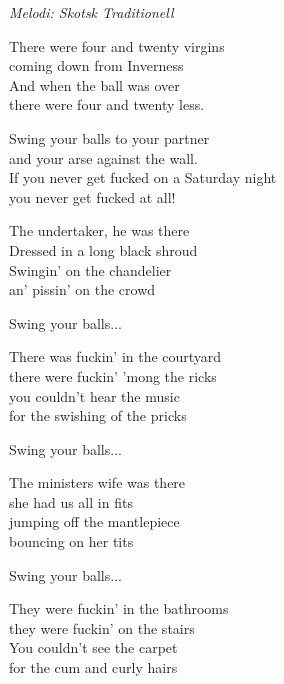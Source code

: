 {\footnotesize\textit{Melodi: Skotsk Traditionell}}\par
\vspace{10pt}
There were four and twenty virgins\\
coming down from Inverness\\
And when the ball was over\\
there were four and twenty less.\par
\vspace{10pt}
Swing your balls to your partner\\
and your arse against the wall.\\
If you never get fucked on a Saturday night\\
you never get fucked at all!\par
\vspace{10pt}
The undertaker, he was there\\
Dressed in a long black shroud\\
Swingin' on the chandelier\\
an' pissin' on the crowd\par
\vspace{10pt}
Swing your balls...\par
\vspace{10pt}
There was fuckin' in the courtyard\\
there were fuckin' 'mong the ricks\\
you couldn't hear the music\\
for the swishing of the pricks\par
\vspace{10pt}
Swing your balls...\par
\vspace{10pt}
The ministers wife was there\\
she had us all in fits\\
jumping off the mantlepiece\\
bouncing on her tits\par
\vspace{10pt}
Swing your balls...\par
\vspace{10pt}
They were fuckin' in the bathrooms\\
they were fuckin' on the stairs\\
You couldn't see the carpet \\
for the cum and curly hairs\par
\vspace{10pt}
